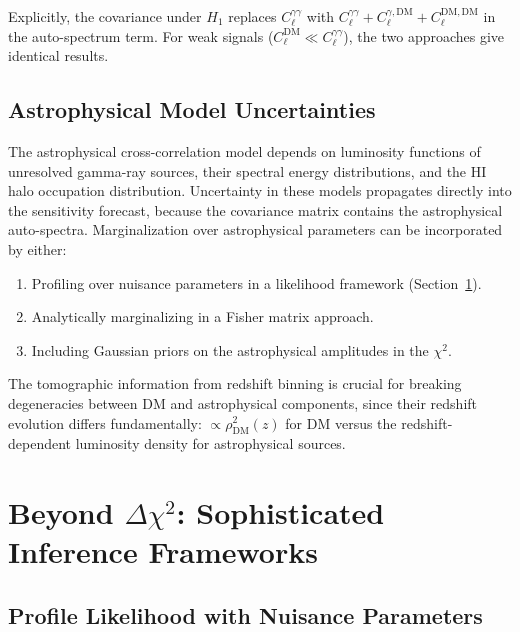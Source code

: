 \documentclass[10pt,a4paper]{article}
\newcommand{\Cl}{C_\ell}
\begin{document}
Explicitly, the covariance under $H_1$ replaces $\Cl^{\gamma\gamma}$ with $\Cl^{\gamma\gamma} + \Cl^{\gamma,\mathrm{DM}} + \Cl^{\mathrm{DM,DM}}$ in the auto-spectrum term. For weak signals ($\Cl^{\mathrm{DM}} \ll \Cl^{\gamma\gamma}$), the two approaches give identical results.


\subsection{Astrophysical Model Uncertainties}

The astrophysical cross-correlation model depends on luminosity functions of unresolved gamma-ray sources, their spectral energy distributions, and the HI halo occupation distribution. Uncertainty in these models propagates directly into the sensitivity forecast, because the covariance matrix contains the astrophysical auto-spectra. Marginalization over astrophysical parameters can be incorporated by either:
\begin{enumerate}[leftmargin=2em]
\item Profiling over nuisance parameters in a likelihood framework (Section~\ref{sec:advanced}).
\item Analytically marginalizing in a Fisher matrix approach.
\item Including Gaussian priors on the astrophysical amplitudes in the $\chi^2$.
\end{enumerate}

The tomographic information from redshift binning is crucial for breaking degeneracies between DM and astrophysical components, since their redshift evolution differs fundamentally: $\propto \rho_{\mathrm{DM}}^2(z)$ for DM versus the redshift-dependent luminosity density for astrophysical sources.


\section{Beyond $\Delta\chi^2$: Sophisticated Inference Frameworks}
\label{sec:advanced}

\subsection{Profile Likelihood with Nuisance Parameters}
\end{document}
